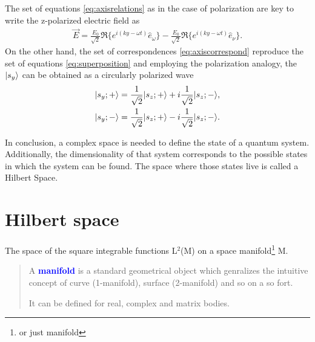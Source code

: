 \documentclass{article}
\begin{document}
The set of equations \ref{eq:axisrelations} as in the case of polarization are key to write the z-polarized electric field as
\begin{align}\label{eq:monochromaticbeam}
  \vec{E}=\frac{E_0}{\sqrt{2}}\Re\{e^{i(ky-\omega t)}\hat{e}_\omega\} - \frac{E_0}{\sqrt{2}}\Re\{e^{i(ky-\omega t)}\hat{e}_\nu\}.
\end{align}
On the other hand, the set of correspondences \ref{eq:axiscorrespond} reproduce the set of equations \ref{eq:superposition} and employing the polarization analogy, the $\lvert s_y\rangle$ can be obtained as a circularly polarized wave
\begin{align}\label{eq:SyCircular}
  \lvert s_y;+\rangle&=\frac{1}{\sqrt{2}}\lvert s_z;+\rangle+i\frac{1}{\sqrt{2}}\lvert s_z;-\rangle,\\
  \lvert s_y;-\rangle&=\frac{1}{\sqrt{2}}\lvert s_z;+\rangle-i\frac{1}{\sqrt{2}}\lvert s_z;-\rangle.
\end{align}

In conclusion, a complex space is needed to define the state of a quantum system. Additionally, the dimensionality of that system corresponds to the possible states in which the system can be found. The space where those states live is called a Hilbert Space.

\section{Hilbert space}

The space of the square integrable functions L$^2$(M) on a space manifold\footnote{or just manifold} M.
\begin{quote}
  A \textcolor{blue}{\textbf{manifold}} is a standard geometrical object which genralizes the intuitive concept of curve (1-manifold), surface (2-manifold) and so on a so fort.

  It can be defined for real, complex and matrix bodies.
\end{quote}
\end{document}
